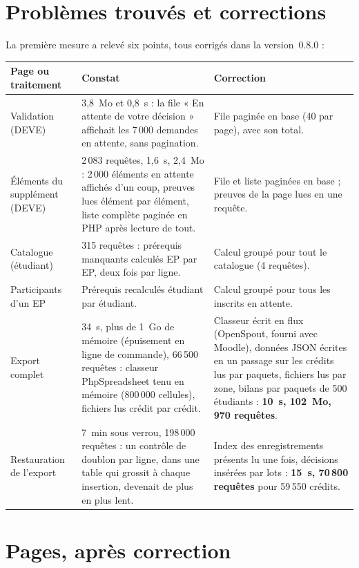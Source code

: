 \documentclass[11pt,a4paper]{article}
\begin{document}
\section{Problèmes trouvés et corrections}

La première mesure a relevé six points, tous corrigés dans la version~0.8.0 :

\begin{longtable}{@{}p{4.2cm}p{5.3cm}p{6.2cm}@{}}
\toprule
\textbf{Page ou traitement} & \textbf{Constat} & \textbf{Correction} \\
\midrule\endhead
Validation (DEVE) & 3,8~Mo et 0,8~s : la file « En attente de votre décision » affichait les
  7\,000 demandes en attente, sans pagination. & File paginée en base (40 par page), avec son
  total. \\
Éléments du supplément (DEVE) & 2\,083 requêtes, 1,6~s, 2,4~Mo : 2\,000 éléments en attente
  affichés d'un coup, preuves lues élément par élément, liste complète paginée en PHP après
  lecture de tout. & File et liste paginées en base ; preuves de la page lues en une requête. \\
Catalogue (étudiant) & 315 requêtes : prérequis manquants calculés EP par EP, deux fois par
  ligne. & Calcul groupé pour tout le catalogue (4 requêtes). \\
Participants d'un EP & Prérequis recalculés étudiant par étudiant. & Calcul groupé pour tous les
  inscrits en attente. \\
Export complet & 34~s, plus de 1~Go de mémoire (épuisement en ligne de commande), 66\,500
  requêtes : classeur PhpSpreadsheet tenu en mémoire (800\,000 cellules), fichiers lus crédit
  par crédit. & Classeur écrit en flux (OpenSpout, fourni avec Moodle), données JSON écrites en
  un passage sur les crédits lus par paquets, fichiers lus par zone, bilans par paquets de 500
  étudiants : \textbf{10~s, 102~Mo, 970 requêtes}. \\
Restauration de l'export & 7~min sous verrou, 198\,000 requêtes : un contrôle de doublon par
  ligne, dans une table qui grossit à chaque insertion, devenait de plus en plus lent. & Index
  des enregistrements présents lu une fois, décisions insérées par lots : \textbf{15~s,
  70\,800 requêtes} pour 59\,550 crédits. \\
\bottomrule
\end{longtable}

\section{Pages, après correction}
\end{document}
